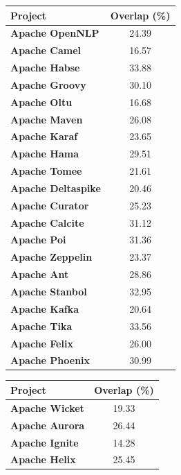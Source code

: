 {\begin{table}[!htbp]
	\begin{tabular}{l|c}
		\hline
		\textbf{Project}           & \textbf{Overlap (\%)} \\ \hline
		\textbf{Apache OpenNLP}    &    24.39     \\ \hline
		\textbf{Apache Camel}      &    16.57     \\ \hline
		\textbf{Apache Habse}      &    33.88     \\ \hline
		\textbf{Apache Groovy}     &    30.10     \\ \hline
		\textbf{Apache Oltu}       &    16.68     \\ \hline
		\textbf{Apache Maven}      &    26.08     \\ \hline
		\textbf{Apache Karaf}      &    23.65     \\ \hline
		\textbf{Apache Hama}       &    29.51     \\ \hline
		\textbf{Apache Tomee}      &    21.61     \\ \hline
		\textbf{Apache Deltaspike} &    20.46     \\ \hline
		\textbf{Apache Curator}    &    25.23     \\ \hline
		\textbf{Apache Calcite}    &    31.12     \\ \hline
		\textbf{Apache Poi}        &    31.36     \\ \hline
		\textbf{Apache Zeppelin}   &    23.37     \\ \hline
		\textbf{Apache Ant}        &    28.86     \\ \hline
		\textbf{Apache Stanbol}    &    32.95     \\ \hline
		\textbf{Apache Kafka}      &    20.64     \\ \hline
		\textbf{Apache Tika}       &    33.56     \\ \hline
		\textbf{Apache Felix}      &    26.00     \\ \hline
		\textbf{Apache Phoenix}    &    30.99     \\ \hline
	\end{tabular}
	\quad \quad \quad
	\begin{tabular}{l|c}
		\hline
		\textbf{Project}           & \textbf{Overlap (\%)} \\ \hline
		\textbf{Apache Wicket}     &    19.33     \\ \hline
		\textbf{Apache Aurora}     &    26.44     \\ \hline
		\textbf{Apache Ignite}     &    14.28     \\ \hline
		\textbf{Apache Helix}      &    25.45     \\ \hline

\end{tabular}
\end{table}}
